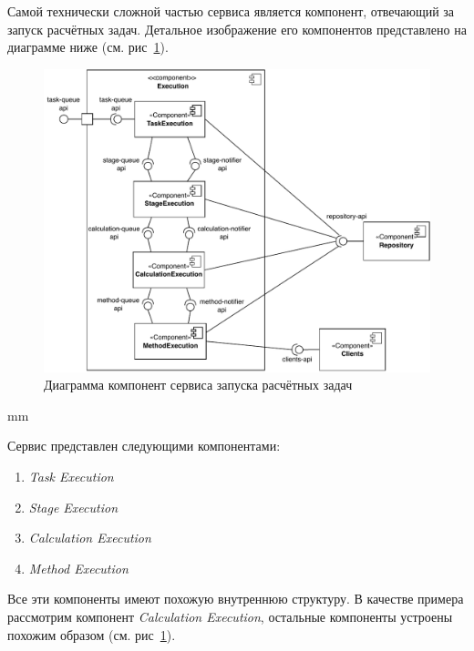 Самой технически сложной частью сервиса является компонент, отвечающий за запуск расчётных задач.
Детальное изображение его компонентов представлено
на диаграмме ниже (см. рис\ \ref{pic:architecture__orchestrator-detailed-component}).

\begin{figure}[H]
	\hspace*{-2.5 cm}\includegraphics[width=\textwidth]{architecture/pictures/orchestrator/component_detailed}
	\caption{Диаграмма компонент сервиса запуска расчётных задач}
	\label{pic:architecture__orchestrator-detailed-component}
\end{figure}
 mm


Сервис представлен следующими компонентами:
\begin{enumerate}
	\item {
		\textit{Task Execution}
	}
	\item {
		\textit{Stage Execution}
	}
	\item {
		\textit{Calculation Execution}
	}
	\item {
		\textit{Method Execution}
	}
\end{enumerate}

Все эти компоненты имеют похожую внутреннюю структуру. В качестве примера рассмотрим компонент
\textit{Calculation Execution}, остальные компоненты устроены похожим образом
(см. рис\ \ref{pic:architecture__orchestrator-detailed-component}).


